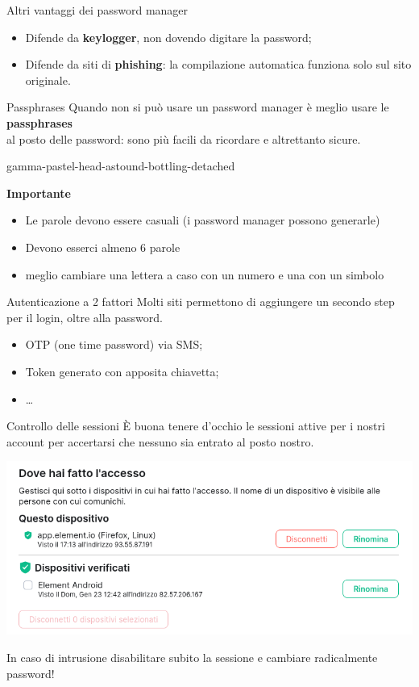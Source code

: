\begin{myframe}{Altri vantaggi dei password manager}
  \begin{itemize}
    \item Difende da \textbf{keylogger}, non dovendo digitare la password;
    \item Difende da siti di \textbf{phishing}: la compilazione automatica funziona solo sul sito originale.
  \end{itemize}
\end{myframe}

\begin{myframe}{Passphrases}
  Quando non si può usare un password manager è meglio usare  le \textbf{passphrases}\\al posto delle password: sono più facili da ricordare e altrettanto sicure.

  \pause\bigskip
  gamma-pastel-head-astound-bottling-detached

  \pause\bigskip
  {\raggedright\textbf{Importante}\\}
  \begin{itemize}
    \item Le parole devono essere casuali (i password manager possono generarle)
    \item Devono esserci almeno 6 parole
    \item meglio cambiare una lettera a caso con un numero e una con un simbolo
  \end{itemize}
\end{myframe}

\begin{myframe}{Autenticazione a 2 fattori}
  Molti siti permettono di aggiungere un secondo step per il login, oltre alla password.
  \begin{itemize}
    \item OTP (one time password) via SMS;
    \item Token generato con apposita chiavetta;
    \item \dots
  \end{itemize}
\end{myframe}

\begin{myframe}{Controllo delle sessioni}
  È buona tenere d'occhio le sessioni attive per i nostri account per accertarsi che nessuno sia entrato al posto nostro.

  \includegraphics[width=.7\textwidth]{img/sessioni}

  \medskip\pause
  In caso di intrusione disabilitare subito la sessione e cambiare radicalmente password!
\end{myframe}
